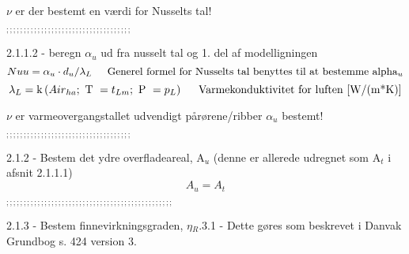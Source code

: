 \documentclass[../Hovedrapport.tex]{subfiles}
\newcommand{\F}[1]{\mbox{$#1$}}
\newcommand{\V}[1]{\mbox{$ #1 $}}
\newcommand{\I}{\mbox{\hspace{0.20in}}}
\newcommand{\conductivity}{\mathrm{k}}
\begin{document}
\vspace{0.10in}
\noindent
\rm $\nu$ er der bestemt en værdi for Nusselts tal!

\vspace{0.10in}
\noindent
\rm $_{;;;;;;;;;;;;;;;;;;;;;;;;;;;;;;;;;;;;}$

\vspace{0.10in}
\noindent
\rm 2.1.1.2 - beregn $\alpha$$_{u}$ ud fra nusselt tal og 1. del af modelligningen
\begin{equation}
\label{EES Eqn:45}
\V{Nuu}  = \alpha_{u} \cdot  d_{u}/\lambda_{L	} 
\mbox{\I Generel formel for Nusselts tal benyttes til at bestemme alpha$_{u}$}
\end{equation}
\begin{equation}
\label{EES Eqn:46}
\lambda_{L} = \conductivity \left(\F{Air}_{ha};\mbox{\ T }= t_{Lm};\mbox{\ P }= p_{L} \right) 	 
\mbox{\I Varmekonduktivitet for luften [W/(m*K)]}
\end{equation}

\vspace{0.10in}
\noindent
\rm $\nu$ er varmeovergangstallet udvendigt p\aa rørene/ribber $\alpha$$_{u}$ bestemt!

\vspace{0.10in}
\noindent
\rm $_{;;;;;;;;;;;;;;;;;;;;;;;;;;;;;;;;;;;;}$

\vspace{0.10in}
\noindent
\rm 2.1.2 - Bestem det ydre overfladeareal, A$_{u}$ (denne er allerede udregnet som A$_{t}$ i afsnit 2.1.1.1)
\begin{equation}
\label{EES Eqn:47}
A_{u} = A_{t} 
\end{equation}

\vspace{0.10in}
\noindent
\rm $_{;;;;;;;;;;;;;;;;;;;;;;;;;;;;;;;;;;;;;;;;;;;;;;;;}$

\vspace{0.10in}
\noindent
\rm 2.1.3 - Bestem finnevirkningsgraden, $\eta$$_{R}$.3.1 - Dette gøres som beskrevet i Danvak Grundbog s. 424 version 3.
\end{document}
